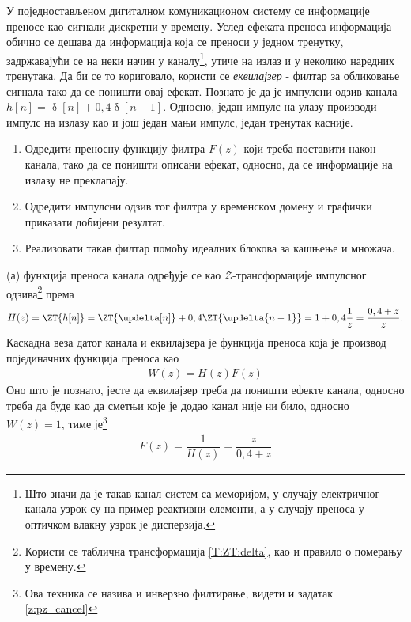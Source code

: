 \PID
У поједностављеном дигиталном комуникационом систему се информације преносе као сигнали дискретни у времену. 
Услед ефеката преноса информација обично се дешава да информација која се 
преноси у једном тренутку, задржавајући се на неки начин у каналу\footnote{Што значи да је такав канал систем са меморијом, у случају 
електричног канала узрок су на пример реактивни елементи, а у случају преноса у оптичком влакну узрок је дисперзија.}, утиче на излаз и у неколико наредних 
тренутака. Да би се то кориговало, користи се \textit{еквилајзер} - филтар за обликовање сигнала тако да се поништи овај ефекат. Познато је да је импулсни
одзив канала $h[n] = \updelta[n] + 0,4 \updelta[n-1]$. Односно, један импулс на улазу производи импулс на излазу као и још један мањи импулс, један 
тренутак касније. 
\begin{enumerate}[label=(\alph*)]
\item Одредити преносну функцију филтра $F(z)$ који треба поставити након канала, тако да се поништи описани ефекат, односно, да се информације на 
излазу не преклапају. 
\item Одредити импулсни одзив тог филтра у временском домену и графички приказати добијени резултат. 
\item Реализовати такав филтар помоћу идеалних блокова за кашњење и множача. 
\end{enumerate}

\RESENJE
(а) функција преноса канала одређује се као $\mathcal{Z}$-трансформације импулсног одзива\footnote{
    Користи се таблична трансформација \ref{T:ZT:delta}, као и правило о померању у времену. 
} према 
\begin{eqnarray}
    H(z) = \ZT{h[n]} = \ZT{\updelta[n]} + 0,4 \ZT{\updelta{n-1}} 
                     = 1 + 0,4\dfrac{1}{z} = \dfrac{0,4 + z}{z}.
\end{eqnarray}
Каскадна веза датог канала и еквилајзера је функција преноса која је производ појединачних функција преноса као 
\begin{eqnarray}
    W(z) = H(z) F(z)
\end{eqnarray}
Оно што је познато, јесте да еквилајзер треба да поништи ефекте канала, односно треба да буде као да сметњи које је додао канал није ни било, 
односно $W(z) = 1$, тиме је\footnote{Ова техника се назива и инверзно филтирање, видети и задатак \ref{z:pz_cancel}}
\begin{eqnarray}
    F(z) = \dfrac{1}{H(z)} = \dfrac{z}{0,4 + z}
\end{eqnarray}

